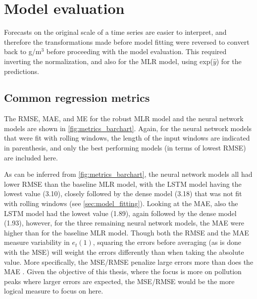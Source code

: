 
\section{Model evaluation}
Forecasts on the original scale of a time series are easier to interpret, and therefore the transformations made before model fitting were reversed to convert back to \textmugreek g/m$^3$ before proceeding with the model evaluation. This required inverting the normalization, and also for the MLR model, using exp($\hat{y}$) for the predictions.

\subsection{Common regression metrics}
The RMSE, MAE, and ME for the robust MLR model and the neural network models are shown in \cref{fig:metrics_barchart}. Again, for the neural network models that were fit with rolling windows, the length of the input windows are indicated in parenthesis, and only the best performing models (in terms of lowest RMSE) are included here. 

As can be inferred from \cref{fig:metrics_barchart}, the neural network models all had lower RMSE than the baseline MLR model, with the LSTM model having the lowest value (3.10), closely followed by the dense model (3.18) that was not fit with rolling windows (see \cref{sec:model_fitting}). Looking at the MAE, also the LSTM model had the lowest value (1.89), again followed by the dense model (1.93), however, for the three remaining neural network models, the MAE were higher than for the baseline MLR model. Though both the RMSE and the MAE measure variability in $e_t(1)$, squaring the errors before averaging (as is done with the MSE) will weight the errors differently than when taking the absolute value. More specifically, the MSE/RMSE penalize large errors more than does the MAE \cite{reg_metrics2018}.
Given the objective of this thesis, where the focus is more on pollution peaks where larger errors are expected, the MSE/RMSE would be the more logical measure to focus on here. 

